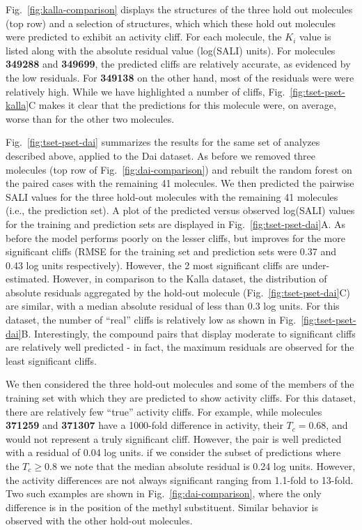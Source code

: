 \documentclass[letterpaper, 12pt]{article}
\begin{document}
Fig.~\ref{fig:kalla-comparison} displays the structures of the three hold out molecules (top row)
and a selection of structures, which which these hold out molecules were predicted to exhibit an
activity cliff. For each molecule, the $K_i$ value is listed along with the absolute residual value
(log(SALI) units). For molecules \textbf{349288} and \textbf{349699}, the predicted cliffs are
relatively accurate, as evidenced by the low residuals. For \textbf{349138} on the other hand, most
of the residuals were were relatively high. While we have highlighted a number of cliffs,
Fig.~\ref{fig:tset-pset-kalla}C makes it clear that the predictions for this molecule were, on
average, worse than for the other two molecules.

Fig.~\ref{fig:tset-pset-dai} summarizes the results for the same set of analyzes described above,
applied to the Dai dataset. As before we removed three molecules (top row of
Fig.~\ref{fig:dai-comparison}) and rebuilt the random forest on the paired cases with the remaining
41 molecules. We then predicted the pairwise SALI values for the three hold-out molecules with the
remaining 41 molecules (i.e., the prediction set). A plot of the predicted versus observed log(SALI)
values for the training and prediction sets are displayed in Fig.~\ref{fig:tset-pset-dai}A. As
before the model performs poorly on the lesser cliffs, but improves for the more significant cliffs
(RMSE for the training set and prediction sets were 0.37 and 0.43 log units respectively). However,
the 2 most significant cliffs are under-estimated. However, in comparison to the Kalla dataset, the
distribution of absolute residuals aggregated by the hold-out molecule
(Fig.~\ref{fig:tset-pset-dai}C) are similar, with a median absolute residual of less than
0.3 log units.  For this dataset, the number of ``real'' cliffs is relatively low as shown in
Fig.~\ref{fig:tset-pset-dai}B. Interestingly, the compound pairs that display moderate to
significant cliffs are relatively well predicted - in fact, the maximum residuals are observed for
the least significant cliffs.

We then considered the three hold-out molecules and some of the members of the training set with
which they are predicted to show activity cliffs. For this dataset, there are relatively few
``true'' activity cliffs. For example, while molecules \textbf{371259} and \textbf{371307} have a
1000-fold difference in activity, their $T_c = 0.68$, and would not represent a truly significant
cliff. However, the pair is well predicted with a residual of 0.04 log units. if we consider the
subset of predictions where the $T_c \geq 0.8$ we note that the median absolute residual is 0.24 log
units. However, the activity differences are not always significant ranging from 1.1-fold to
13-fold. Two such examples are shown in Fig.~\ref{fig:dai-comparison}, where the only difference is
in the position of the methyl substituent. Similar behavior is observed with the other hold-out
molecules.
\end{document}
